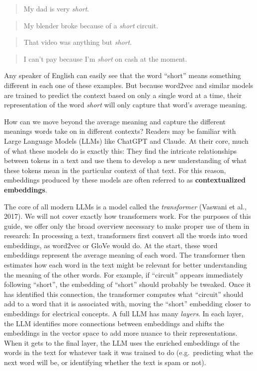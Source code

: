 \documentclass[
  man,
  floatsintext,
  longtable,
  nolmodern,
  notxfonts,
  notimes,
  colorlinks=true,linkcolor=blue,citecolor=blue,urlcolor=blue]{apa7}
\begin{document}
\begin{quote}
My dad is very \emph{short}.
\end{quote}

\begin{quote}
My blender broke because of a \emph{short} circuit.
\end{quote}

\begin{quote}
That video was anything but \emph{short}.
\end{quote}

\begin{quote}
I can't pay because I'm \emph{short} on cash at the moment.
\end{quote}

Any speaker of English can easily see that the word ``short'' means
something different in each one of these examples. But because word2vec
and similar models are trained to predict the context based on only a
single word at a time, their representation of the word \emph{short}
will only capture that word's average meaning.

How can we move beyond the average meaning and capture the different
meanings words take on in different contexts? Readers may be familiar
with Large Language Models (LLMs) like ChatGPT and Claude. At their
core, much of what these models do is exactly this: They find the
intricate relationships between tokens in a text and use them to develop
a new understanding of what these tokens mean in the particular context
of that text. For this reason, embeddings produced by these models are
often referred to as \textbf{contextualized embeddings}.

The core of all modern LLMs is a model called the \emph{transformer}
(Vaswani et al., 2017). We will not cover exactly how transformers work.
For the purposes of this guide, we offer only the broad overview
necessary to make proper use of them in research: In processing a text,
transformers first convert all the words into word embeddings, as
word2vec or GloVe would do. At the start, these word embeddings
represent the average meaning of each word. The transformer then
estimates how each word in the text might be relevant for better
understanding the meaning of the other words. For example, if
``circuit'' appears immediately following ``short'', the embedding of
``short'' should probably be tweaked. Once it has identified this
connection, the transformer computes what ``circuit'' should add to a
word that it is associated with, moving the ``short'' embedding closer
to embeddings for electrical concepts. A full LLM has many
\emph{layers}. In each layer, the LLM identifies more connections
between embeddings and shifts the embeddings in the vector space to add
more nuance to their representations. When it gets to the final layer,
the LLM uses the enriched embeddings of the words in the text for
whatever task it was trained to do (e.g.~predicting what the next word
will be, or identifying whether the text is spam or not).
\end{document}
